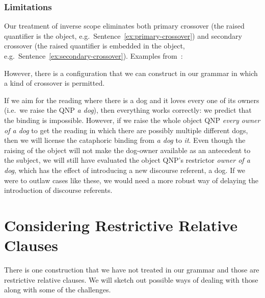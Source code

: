 \subsubsection{Limitations}

Our treatment of inverse scope eliminates both primary crossover (the
raised quantifier is the object, e.g.\ Sentence~\ref{ex:primary-crossover})
and secondary crossover (the raised quantifier is embedded in the object,
e.g.\ Sentence~\ref{ex:secondary-crossover}). Examples
from~\cite{shan2006explaining}:

\begin{exe}
\end{exe}

However, there is a configuration that we can construct in our grammar in
which a kind of crossover is permitted.

\begin{exe}
\end{exe}

If we aim for the reading where there is a dog and it loves every one of
its owners (i.e.\ we raise the QNP \emph{a dog}), then everything works
correctly: we predict that the binding is impossible. However, if we raise
the whole object QNP \emph{every owner of a dog} to get the reading in
which there are possibly multiple different dogs, then we will license the
cataphoric binding from \emph{a dog} to \emph{it}. Even though the raising
of the object will not make the dog-owner available as an antecedent to the
subject, we will still have evaluated the object QNP's restrictor
\emph{owner of a dog}, which has the effect of introducing a new discourse
referent, a dog. If we were to outlaw cases like these, we would need a
more robust way of delaying the introduction of discourse referents.


\section{Considering Restrictive Relative Clauses}
\label{sec:relative-clauses}

There is one construction that we have not treated in our grammar and those
are restrictive relative clauses. We will sketch out possible ways of
dealing with those along with some of the challenges.

